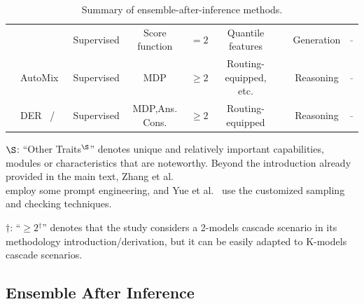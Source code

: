 \documentclass{article}
\newcommand{\cmark}{\ding{51}}%
\begin{document}
\begin{table}[t]
{\begin{threeparttable}
{\begin{tabular}{llcc c c c c c }
&  \cite{gupta2024language} 	& Supervised & Score function 
& $=2$ & Quantile features & \cmark & Generation & \textcolor{gray}{-}\\

&  \cellcolor[rgb]{ .867, .922, .969}AutoMix~\cite{aggarwal2023automix}	& \cellcolor[rgb]{ .867, .922, .969}Supervised & \cellcolor[rgb]{ .867, .922, .969}MDP &\cellcolor[rgb]{ .867, .922, .969}$\geq2$ &\cellcolor[rgb]{ .867, .922, .969}Routing-equipped, etc.&\cellcolor[rgb]{ .867, .922, .969}\cmark &\cellcolor[rgb]{ .867, .922, .969}Reasoning &\cellcolor[rgb]{ .867, .922, .969}\textcolor{gray}{-}\\

&  DER~\cite{hu2024dynamic} / & Supervised & MDP,Ans. Cons. &$\geq2$ &Routing-equipped&\cmark &Reasoning&\textcolor{gray}{-} \\
\bottomrule
\end{tabular}
}
\begin{tablenotes}
\small
\item[1] $\S$: 
``Other Traits$^{\S}$'' denotes 
unique and relatively important capabilities, modules or characteristics that are noteworthy.
Beyond the introduction already provided in the main text,  
Zhang et al.~ \\
 employ some prompt engineering, and Yue et al.~ use the customized sampling and checking techniques.
\item[2] $\dag$: ``$\geq2$$^{\dag}$'' denotes  that the study considers a 2-models cascade scenario in its methodology introduction/derivation, but it can be easily adapted to K-models cascade scenarios.
\end{tablenotes}
\end{threeparttable} 
}
\smallskip
\hfil
\captionsetup{type=table,skip=5pt}
  \caption{Summary of ensemble-after-inference methods.}
    \label{tab:Ensemble-after-inference}
\end{table}











\subsection{Ensemble After Inference}
\label{Ensemble-after-inference}
\end{document}
